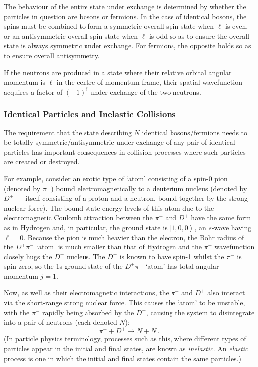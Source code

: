 \documentclass{article}
\theoremstyle{plain}\theoremheaderfont{\normalfont\itshape}\theorembodyfont{\rmfamily}\theoremseparator{.}\newtheorem*{rem}{Remark}\newtheorem*{ex}{Example}\newtheorem*{proof}{Proof}\newtheorem*{altp}{Alternative proof}
\theoremstyle{plain}\theoremheaderfont{\normalfont\bfseries}\theorembodyfont{\rmfamily}\theoremseparator{.}\newtheorem{thm}{Theorem}[section]\newtheorem{lem}[thm]{Lemma}\newtheorem{prop}[thm]{Proposition}\newtheorem*{cor}{Corollary}\newtheorem{defn}[thm]{Definition}\newtheorem{clm}[thm]{Claim}\newtheorem{clminproof}{Claim}
\theoremstyle{break}\theoremheaderfont{\normalfont\itshape}\theorembodyfont{\rmfamily}\theoremseparator{.\medskip}\newtheorem*{proofskip}{Proof}\newtheorem*{exs}{Examples}\newtheorem*{rems}{Remarks}
\theoremstyle{break}\theoremheaderfont{\normalfont\bfseries}\theorembodyfont{\rmfamily}\theoremseparator{.\medskip}\newtheorem{lemskip}[thm]{Lemma}\newtheorem{defnskip}[thm]{Definition}\newtheorem{propskip}[thm]{Proposition}\newtheorem{thmskip}[thm]{Theorem}
\numberwithin{equation}{section}
\newcommand{\ket}[1]{\left| #1 \right\rangle}
\begin{document}
    The behaviour of the entire state under exchange is determined by whether the particles in question are bosons or fermions. In the case of identical bosons, the spins must be combined to form a symmetric overall spin state when \(\ell\) is even, or an antisymmetric overall spin state when \(\ell\) is odd so as to ensure the overall state is always symmetric under exchange. For fermions, the opposite holds so as to ensure overall antisymmetry.
    
    If the neutrons are produced in a state where their relative orbital angular momentum is \(\ell\) in the centre of momentum frame, their spatial wavefunction acquires a factor of \((-1)^\ell\) under exchange of the two neutrons.

    \subsubsection{Identical Particles and Inelastic Collisions}\label{intrinsic_parity}
    The requirement that the state describing \(N\) identical bosons/fermions needs to be totally symmetric/antisymmetric under exchange of any pair of identical particles has important consequences in collision processes where such particles are created or destroyed.

    For example, consider an exotic type of `atom' consisting of a spin-0 pion (denoted by \(\pi^-\)) bound electromagnetically to a deuterium nucleus (denoted by \(D^+\) --- itself consisting of a proton and a neutron, bound together by the strong nuclear force). The bound state energy levels of this atom due to the electromagnetic Coulomb attraction between the \(\pi^-\) and \(D^+\) have the same form as in Hydrogen and, in particular, the ground state is \(\ket{1,0,0}\), an \(s\)-wave having \(\ell=0\). Because the pion is much heavier than the electron, the Bohr radius of the \(D^+\pi^-\) `atom' is much smaller than that of Hydrogen and the \(\pi^-\) wavefunction closely hugs the \(D^+\) nucleus. The \(D^+\) is known to have spin-1 whilst the \(\pi^-\) is spin zero, so the 1s ground state of the \(D^+\pi^-\) `atom' has total angular momentum \(j=1\).

    Now, as well as their electromagnetic interactions, the \(\pi^-\) and \(D^+\) also interact via the short-range strong nuclear force. This causes the `atom' to be unstable, with the \(\pi^-\) rapidly being absorbed by the \(D^+\), causing the system to disintegrate into a pair of neutrons (each denoted \(N\)):
    \begin{equation}
        \pi^- + D^+ \longrightarrow N+N\,.
    \end{equation}
    (In particle physics terminology, processes such as this, where different types of particles appear in the initial and final states, are known as \textit{inelastic}. An \textit{elastic} process is one in which the initial and final states contain the same particles.)
\end{document}
